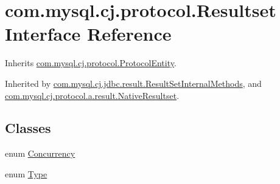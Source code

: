 \hypertarget{interfacecom_1_1mysql_1_1cj_1_1protocol_1_1_resultset}{}\section{com.\+mysql.\+cj.\+protocol.\+Resultset Interface Reference}
\label{interfacecom_1_1mysql_1_1cj_1_1protocol_1_1_resultset}


Inherits \mbox{\hyperlink{interfacecom_1_1mysql_1_1cj_1_1protocol_1_1_protocol_entity}{com.\+mysql.\+cj.\+protocol.\+Protocol\+Entity}}.



Inherited by \mbox{\hyperlink{interfacecom_1_1mysql_1_1cj_1_1jdbc_1_1result_1_1_result_set_internal_methods}{com.\+mysql.\+cj.\+jdbc.\+result.\+Result\+Set\+Internal\+Methods}}, and \mbox{\hyperlink{classcom_1_1mysql_1_1cj_1_1protocol_1_1a_1_1result_1_1_native_resultset}{com.\+mysql.\+cj.\+protocol.\+a.\+result.\+Native\+Resultset}}.

\subsection*{Classes}
\begin{DoxyCompactItemize}
\item 
enum \mbox{\hyperlink{enumcom_1_1mysql_1_1cj_1_1protocol_1_1_resultset_1_1_concurrency}{Concurrency}}
\item 
enum \mbox{\hyperlink{enumcom_1_1mysql_1_1cj_1_1protocol_1_1_resultset_1_1_type}{Type}}
\end{DoxyCompactItemize}
